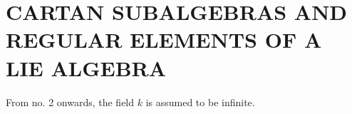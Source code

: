 \section{CARTAN SUBALGEBRAS AND REGULAR ELEMENTS OF A LIE ALGEBRA}

From no. 2 onwards, the field \(k\) is assumed to be infinite.


